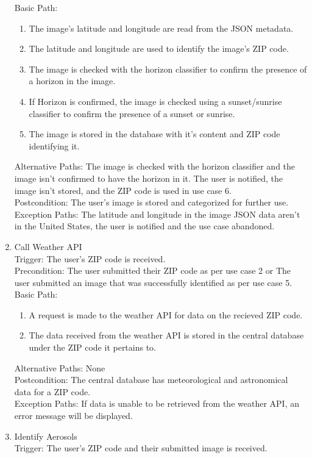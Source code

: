 \documentclass[journal,10pt,draftclsnofoot,onecolumn]{IEEEtran}
\begin{document}
\begin{singlespace}
\begin{enumerate}
Basic Path:\begin{enumerate}
\item The image's latitude and longitude are read from the JSON metadata.
\item The latitude and longitude are used to identify the image's ZIP code.
\item The image is checked with the horizon classifier to confirm the presence of a horizon in the image.
\item If Horizon is confirmed, the image is checked using a sunset/sunrise classifier to confirm the presence of a sunset or sunrise.
\item The image is stored in the database with it's content and ZIP code identifying it.
\end{enumerate}
Alternative Paths: The image is checked with the horizon classifier and the image isn't confirmed to have the horizon in it. The user is notified, the image isn't stored, and the ZIP code is used in use case 6.\\
Postcondition: The user's image is stored and categorized for further use.\\
Exception Paths: The latitude and longitude in the image JSON data aren't in the United States, the user is notified and the use case abandoned.
\\
\item Call Weather API\\
Trigger: The user's ZIP code is received.\\
Precondition: The user submitted their ZIP code as per use case 2 or The user submitted an image that was successfully identified as per use case 5.\\
Basic Path:\begin{enumerate}
\item A request is made to the weather API for data on the recieved ZIP code.
\item The data received from the weather API is stored in the central database under the ZIP code it pertains to.
\end{enumerate}
Alternative Paths: None\\
Postcondition: The central database has meteorological and astronomical data for a ZIP code.\\
Exception Paths: If data is unable to be retrieved from the weather API, an error message will be displayed.
\\
\item Identify Aerosols\\
Trigger: The user's ZIP code and their submitted image is received.\\

\end{enumerate}
\end{singlespace}
\end{document}
